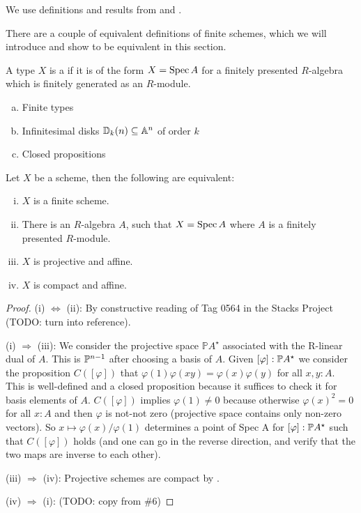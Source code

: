 We use definitions and results from \cite{draft} and \cite{proper-draft}.

There are a couple of equivalent definitions of finite schemes, which we will introduce and show to be equivalent in this section.

\begin{definition}
  A type $X$ is a  if it is of the form $X=\operatorname{Spec} A$ for a finitely presented $R$-algebra which is finitely generated as an $R$-module.
\end{definition}

\begin{example}
  \begin{enumerate}[(a)]
  \item Finite types
  \item Infinitesimal disks $\mathbb{D}_k(n)\subseteq\mathbb{A}^n$ of order $k$
  \item Closed propositions
  \end{enumerate}
\end{example}

\begin{theorem}
  \label{finite-scheme-characterization}
  Let $X$ be a scheme, then the following are equivalent:
  \begin{enumerate}[(i)]
  \item $X$ is a finite scheme.
  \item There is an $R$-algebra $A$, such that $X=\operatorname{Spec} A$ where $A$ is a finitely presented $R$-module.
  \item $X$ is projective and affine.
  \item $X$ is compact and affine.
  \end{enumerate}
\end{theorem}

\begin{proof}
  (i) $\Leftrightarrow$ (ii): By constructive reading of Tag 0564 in the Stacks Project (TODO: turn into reference).
  
  (i) $\Rightarrow$ (iii): We consider the projective space $\mathbb PA^\star$ associated with the R-linear dual of $A$.
  This is $\mathbb{P}^{n-1}$ after choosing a basis of $A$.
  Given $[\varphi] : \mathbb{P} A^\star$ we consider the proposition $C([\varphi])$ that $\varphi(1) \varphi(xy) = \varphi(x) \varphi(y)$ for all $x, y  : A$.
  This is well-defined and a closed proposition because it suffices to check it for basis elements of $A$.
  $C([\varphi])$ implies $\varphi(1) \ne 0$ because otherwise $\varphi(x)^2 = 0$ for all $x : A$ and then $\varphi$ is not-not zero (projective space contains only non-zero vectors).
  So $x \mapsto \varphi(x) / \varphi(1)$ determines a point of Spec A for $[\varphi] : \mathbb{P} A^\star$ such that $C([\varphi])$ holds (and one can go in the reverse direction, and verify that the two maps are inverse to each other).

  (iii) $\Rightarrow$ (iv): Projective schemes are compact by \cite[Theorem 3.0.7]{proper-draft}. 
  
  (iv) $\Rightarrow$ (i): (TODO: copy from \#6)
\end{proof}

